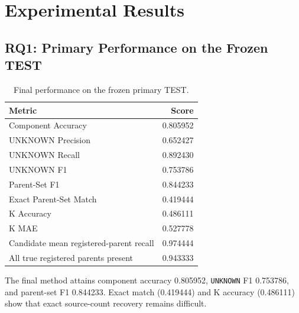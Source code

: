 \documentclass[runningheads]{llncs}
\begin{document}
\section{Experimental Results}

\subsection{RQ1: Primary Performance on the Frozen TEST}
\begin{table}[!htbp]
\centering
\caption{Final performance on the frozen primary TEST.}
\label{tab:mainresult}
\scriptsize
\begin{tabular}{lr}
\toprule
Metric & Score\\
\midrule
Component Accuracy & 0.805952\\
UNKNOWN Precision & 0.652427\\
UNKNOWN Recall & 0.892430\\
UNKNOWN F1 & 0.753786\\
Parent-Set F1 & 0.844233\\
Exact Parent-Set Match & 0.419444\\
K Accuracy & 0.486111\\
K MAE & 0.527778\\
Candidate mean registered-parent recall & 0.974444\\
All true registered parents present & 0.943333\\
\bottomrule
\end{tabular}
\end{table}
The final method attains component accuracy 0.805952, \texttt{UNKNOWN} F1 0.753786, and parent-set F1 0.844233. Exact match (0.419444) and K accuracy (0.486111) show that exact source-count recovery remains difficult.
\end{document}
